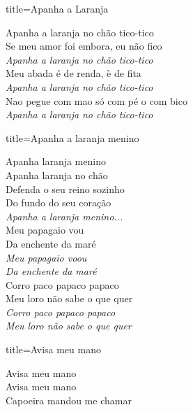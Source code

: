 \documentclass[fontsize=14pt, paper=a4, twoside, DIV=20]{scrreprt} %
\begin{document}
\begin{multicols*}{2}
\begin{song}{title={Apanha a Laranja}}

    \begin{verse*}
        Apanha a laranja no chão tico-tico\\
        Se meu amor foi embora, eu não fico\\

        \textit{Apanha a laranja} \textit{no chão tico-tico}\\
        Meu abada é de renda, è de fita\\
        \textit{Apanha a laranja} \textit{no chão tico-tico}\\
        Nao pegue com mao só com pé o com bico\\
        \textit{Apanha a laranja} \textit{no chão tico-tico} \\  
    \end{verse*}

\end{song}


\columnbreak
\begin{song}{title={Apanha a laranja menino}}

    \begin{verse*}
        Apanha laranja menino\\
        Apanha laranja no chão\\
        Defenda o seu reino sozinho\\
        Do fundo do seu coração\\

        \textit{Apanha a laranja menino...}\\
        Meu papagaio vou\\
        Da enchente da maré\\
        \textit{Meu papagaio voou}\\
        \textit{Da enchente da maré}\\
        Corro paco papaco papaco\\
        Meu loro não sabe o que quer\\
        \textit{Corro paco papaco papaco}\\
        \textit{Meu loro não sabe o que quer}\\
    \end{verse*}
\end{song}

\begin{song}{title={Avisa meu mano}}
    \begin{verse*}
       Avisa meu mano  \\
       Avisa meu mano  \\
       Capoeira mandou me chamar \\


\end{verse*}
\end{song}
\end{multicols*}
\end{document}
